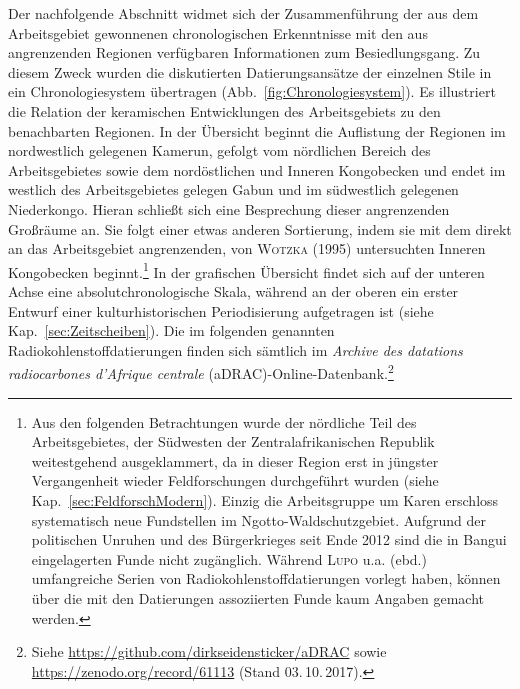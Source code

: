 
Der nachfolgende Abschnitt widmet sich der Zusammenführung der aus dem Arbeitsgebiet gewonnenen chronologischen Erkenntnisse mit den aus angrenzenden Regionen verfügbaren Informationen zum Besiedlungsgang. Zu diesem Zweck wurden die diskutierten Datierungsansätze der einzelnen Stile in ein Chronologiesystem übertragen (Abb.~\ref{fig:Chronologiesystem}). Es illustriert die Relation der keramischen Entwicklungen des Arbeitsgebiets zu den benachbarten Regionen. In der Übersicht beginnt die Auflistung der Regionen im nordwestlich gelegenen Kamerun, gefolgt vom nördlichen Bereich des Arbeitsgebietes sowie dem nordöstlichen und Inneren Kongobecken und endet im westlich des Arbeitsgebietes gelegen Gabun und im südwestlich gelegenen Niederkongo. Hieran schließt sich eine Besprechung dieser angrenzenden Großräume an. Sie folgt einer etwas anderen Sortierung, indem sie mit dem direkt an das Arbeitsgebiet angrenzenden, von \textsc{Wotzka} (1995) untersuchten Inneren Kongobecken beginnt.\footnote{Aus den folgenden Betrachtungen wurde der nördliche Teil des Arbeitsgebietes, der Südwesten der Zentralafrikanischen Republik weitestgehend ausgeklammert, da in dieser Region erst in jüngster Vergangenheit wieder Feldforschungen durchgeführt wurden (siehe Kap.~\ref{sec:FeldforschModern}). Einzig die Arbeitsgruppe um Karen \textcites{Lupo.2015}{Lupo.2018} erschloss systematisch neue Fundstellen im Ngotto-Waldschutzgebiet. Aufgrund der politischen Unruhen und des Bürgerkrieges seit Ende 2012 sind die in Bangui eingelagerten Funde nicht zugänglich. Während \textsc{Lupo} u.a. (ebd.) umfangreiche Serien von Radiokohlenstoffdatierungen vorlegt haben, können über die mit den Datierungen assoziierten Funde kaum Angaben gemacht werden.\label{ftn:Lupo2018}} In der grafischen Übersicht findet sich auf der unteren Achse eine absolutchronologische Skala, während an der oberen ein erster Entwurf einer kulturhistorischen Periodisierung aufgetragen ist (siehe Kap.~\ref{sec:Zeitscheiben}). Die im folgenden genannten Radiokohlenstoffdatierungen finden sich sämtlich im \textit{Archive des datations radiocarbones d’Afrique centrale} (aDRAC)-Online-Datenbank.\footnote{Siehe \url{https://github.com/dirkseidensticker/aDRAC} sowie \url{https://zenodo.org/record/61113} (Stand 03.\,10.\,2017).}